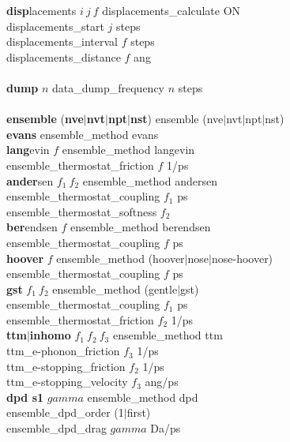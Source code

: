 \begin{tabbing}
\>    {\bf disp}lacements $i~j~f$ \> displacements\_calculate ON  \\
\> \> displacements\_start $j$ steps \\
\> \> displacements\_interval $f$ steps \\
\> \> displacements\_distance $f$ ang \\\\
\>    {\bf dump} $n$ \> data\_dump\_frequency $n$ steps \\\\
\>    {\bf ensemble} ({\bf nve}$|${\bf nvt}$|${\bf npt}$|${\bf nst}) \> ensemble (nve$|$nvt$|$npt$|$nst) \\
\>    {\bf evans} \> ensemble\_method evans \\
\>    {\bf lang}evin $f$ \> ensemble\_method langevin \\
\>    \> ensemble\_thermostat\_friction $f$ 1/ps \\
\>    {\bf ander}sen $f_{1}~f_{2}$ \> ensemble\_method andersen \\
\>    \> ensemble\_thermostat\_coupling $f_{1}$ ps \\
\>    \> ensemble\_thermostat\_softness $f_{2}$ \\
\>    {\bf ber}endsen $f$ \> ensemble\_method berendsen \\
\>    \> ensemble\_thermostat\_coupling $f$ ps \\
\>    {\bf hoover} $f$ \> ensemble\_method (hoover$|$nose$|$nose-hoover) \\
\>    \> ensemble\_thermostat\_coupling $f$ ps \\
\>    {\bf gst} $f_{1}~f_{2}$ \> ensemble\_method (gentle$|$gst) \\
\>    \> ensemble\_thermostat\_coupling $f_{1}$ ps \\
\>    \> ensemble\_thermostat\_friction $f_{2}$ 1/ps \\
\>    {\bf ttm}$|${\bf inhomo} $f_{1}~f_{2}~f_{3}$ \> ensemble\_method ttm \\
\>    \> ttm\_e-phonon\_friction   $f_{3}$ 1/ps \\
\>    \> ttm\_e-stopping\_friction $f_{2}$ 1/ps \\
\>    \> ttm\_e-stopping\_velocity $f_{3}$ ang/ps \\
\>    {\bf dpd s1} $gamma$ \> ensemble\_method dpd \\
\>    \> ensemble\_dpd\_order (1$|$first) \\
\>    \> ensemble\_dpd\_drag $gamma$ Da/ps \\

\end{tabbing}
